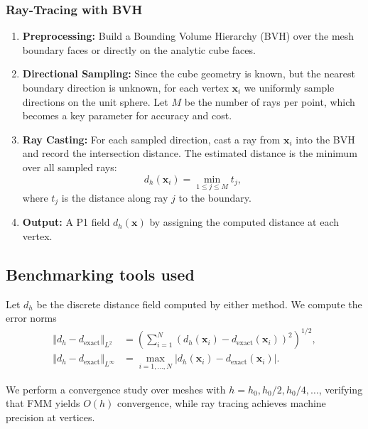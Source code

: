 \subsubsection{Ray-Tracing with BVH}
\begin{enumerate}
  \item \textbf{Preprocessing:} Build a Bounding Volume Hierarchy (BVH) over the mesh boundary faces or directly on the analytic cube faces.
  \item \textbf{Directional Sampling:} Since the cube geometry is known, but the nearest boundary direction is unknown, for each vertex $\mathbf{x}_i$ we uniformly sample directions on the unit sphere. Let $M$ be the number of rays per point, which becomes a key parameter for accuracy and cost.
  \item \textbf{Ray Casting:} For each sampled direction, cast a ray from $\mathbf{x}_i$ into the BVH and record the intersection distance. The estimated distance is the minimum over all sampled rays:
  \[ d_h(\mathbf{x}_i) = \min_{1\le j\le M} t_j, \]
  where $t_j$ is the distance along ray $j$ to the boundary.
  \item \textbf{Output:} A P1 field $d_h(\mathbf{x})$ by assigning the computed distance at each vertex.
\end{enumerate}





\subsection{Benchmarking tools used}

Let $d_h$ be the discrete distance field computed by either method. We compute the error norms
\begin{subequations}
\begin{align}
  \Vert d_h - d_{\mathrm{exact}}\Vert_{L^2} &= \left( \sum_{i=1}^N (d_h(\mathbf{x}_i) - d_{\mathrm{exact}}(\mathbf{x}_i))^2
    \right)^{1/2},\\
  \Vert d_h - d_{\mathrm{exact}}\Vert_{L^\infty} &= \max_{i=1,\dots,N} |d_h(\mathbf{x}_i) - d_{\mathrm{exact}}(\mathbf{x}_i)|.
\end{align}
\label{eq:specs:feelpp:distance:error}
\end{subequations}

We perform a convergence study over meshes with $h = h_0, h_0/2, h_0/4, \dots$, verifying that FMM yields $O(h)$ convergence, while ray tracing achieves machine precision at vertices.



